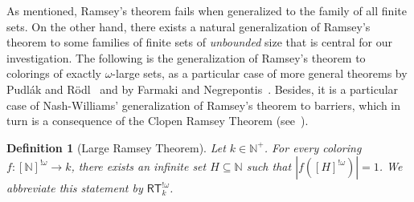 \documentclass{article}
\newcommand{\RT}[0]{\mathsf{RT}}
\newcommand{\NN}[0]{\mathbb{N}}
\numberwithin{theorem}{section}
\newtheorem{definition}[theorem]{Definition}
\newcommand{\ludovic}[1]{\textcolor{blue}{#1}}
\newcommand{\lorenzo}[1]{\textcolor{orange}{#1}}
\begin{document}
As mentioned, Ramsey's theorem fails when generalized to the family of all finite sets. On the other hand, there exists a natural generalization of Ramsey's theorem to some families of finite sets of {\em unbounded} size that is central for our investigation. The following is the generalization of Ramsey's theorem to colorings of exactly $\omega$-large sets, as a particular case of more general theorems by Pudl\'ak and R\"{o}dl~\cite{Pud-Rod:82} and by Farmaki and Negrepontis~\cite{Far-Neg:08}. 
Besides, it is a particular case of Nash-Williams' generalization of Ramsey's theorem to barriers, which in turn is a consequence of the Clopen Ramsey Theorem (see~\cite{SIM:SOSOA}). 






\begin{definition}[Large Ramsey Theorem]\label{def:largeRT} Let $k\in \NN^+$. 
For every coloring $f:[\NN]^{!\omega} \to k$, there exists an infinite set $H \subseteq \NN$ such that $|f([H]^{!\omega})| = 1$. We abbreviate this statement by  $\RT^{!\omega}_k$.
\end{definition}
\end{document}
